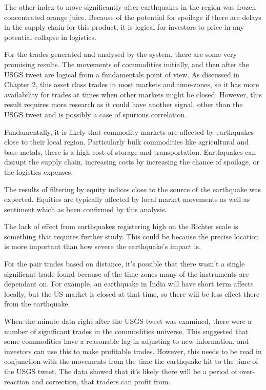 The other index to move significantly after earthquakes in the region was frozen concentrated orange juice. Because of the potential for spoilage if there are delays in the supply chain for this product, it is logical for investors to price in any potential collapse in logistics.

For the trades generated and analysed by the system, there are some very promising results. The movements of commodities initially, and then after the USGS tweet are logical from a fundamentals point of view. As discussed in Chapter 2, this asset class trades in most markets and time-zones, so it has more availability for trades at times when other markets might be closed. However, this result requires more research as it could have another signal, other than the USGS tweet and is possibly a case of spurious correlation.

Fundamentally, it is likely that commodity markets are affected by earthquakes close to their local region. Particularly bulk commodities like agricultural and base metals, there is a high cost of storage and transportation. Earthquakes can disrupt the supply chain, increasing costs by increasing the chance of spoilage, or the logistics expenses.

The results of filtering by equity indices close to the source of the earthquake was expected. Equities are typically affected by local market movements as well as sentiment which as been confirmed by this analysis.

The lack of effect from earthquakes registering high on the Richter scale is something that requires further study. This could be because the precise location is more important than how severe the earthquake's impact is.

For the pair trades based on distance, it's possible that there wasn't a single significant trade found because of the time-zones many of the instruments are dependant on. For example, an earthquake in India will have short term affects locally, but the US market is closed at that time, so there will be less effect there from the earthquake.

When the minute data right after the USGS tweet was examined, there were a number of significant trades in the commodities universe. This suggested that some commodities have a reasonable lag in adjusting to new information, and investors can use this to make profitable trades. However, this needs to be read in conjunction with the movements from the time the earthquake hit to the time of the USGS tweet. The data showed that it's likely there will be a period of over-reaction and correction, that traders can profit from.

